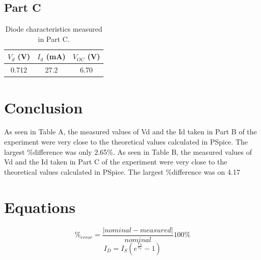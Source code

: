 \documentclass{article}
\begin{document}
\subsection{Part C}
\label{sec:result_c}

\begin{table}[hbtp]
  \centering
  \begin{tabular}{ccc}
    $V_d$ (\si{V}) & $I_d$ (\si{mA}) & $V_{OC}$ (\si{V}) \\
    \hline
    0.712 & 27.2 & 6.70 \\
  \end{tabular}
  \caption{\label{tab:part_b} Diode characteristics measured in Part C.}
\end{table}

\section{Conclusion}
\label{sec:conclusion}

As seen in Table A, the measured values of Vd and the Id taken in Part
B of the experiment were very close to the theoretical values
calculated in PSpice. The largest \%difference was only 2.65\%.  As seen
in Table B, the measured values of Vd and the Id taken in Part C of
the experiment were very close to the theoretical values calculated in
PSpice. The largest \%difference was on 4.17%

\section{Equations}
\label{sec:equations}

\begin{equation}
  \label{eqn:percent_err}
  \%_{error} = \frac{|nominal - measured|}{nominal}100\%
\end{equation}
%
\begin{equation}
  \label{eqn:schlockley}
  I_D = I_S \left(e^{\frac{V_D}{V_T}} - 1\right)
\end{equation}
\end{document}
